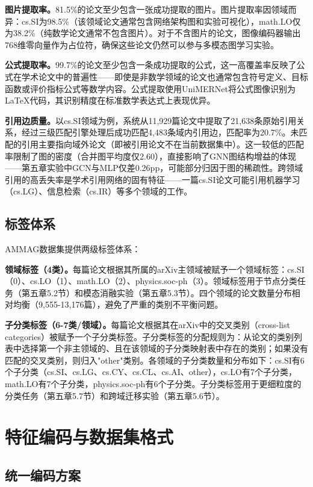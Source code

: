 \textbf{图片提取率。}81.5\%的论文至少包含一张成功提取的图片。图片提取率因领域而异：cs.SI为98.5\%（该领域论文通常包含网络架构图和实验可视化），math.LO仅为38.2\%（纯数学论文通常不包含图片）。对于不含图片的论文，图像编码器输出768维零向量作为占位符，确保这些论文仍然可以参与多模态图学习实验。

\textbf{公式提取率。}99.7\%的论文至少包含一条成功提取的公式，这一高覆盖率反映了公式在学术论文中的普遍性——即使是非数学领域的论文也通常包含符号定义、目标函数或评价指标公式等数学内容。公式提取使用UniMERNet\cite{wang2024unimernet}将公式图像识别为LaTeX代码，其识别精度在标准数学表达式上表现优异。

\textbf{引用边质量。}以cs.SI领域为例，系统从11,929篇论文中提取了21,638条原始引用关系，经过三级匹配引擎处理后成功匹配4,483条域内引用边，匹配率为20.7\%。未匹配的引用主要指向域外论文（即被引用论文不在当前数据集中）。这一较低的匹配率限制了图的密度（合并图平均度仅2.60），直接影响了GNN图结构增益的体现——第五章实验中GCN与MLP仅差0.26pp，可能部分归因于图的稀疏性。跨领域引用的高丢失率是学术引用网络的固有特征——一篇cs.SI论文可能引用机器学习（cs.LG）、信息检索（cs.IR）等多个领域的工作。

\subsection{标签体系}

AMMAG数据集提供两级标签体系：

\textbf{领域标签（4类）。}每篇论文根据其所属的arXiv主领域被赋予一个领域标签：cs.SI（0）、cs.LO（1）、math.LO（2）、physics.soc-ph（3）。领域标签用于节点分类任务（第五章5.2节）和模态消融实验（第五章5.3节）。四个领域的论文数量分布相对均衡（9,555-13,176篇），避免了严重的类别不平衡问题。

\textbf{子分类标签（6-7类/领域）。}每篇论文根据其在arXiv中的交叉类别（cross-list categories）被赋予一个子分类标签。子分类标签的分配规则为：从论文的类别列表中选择第一个非主领域的、且在该领域的子分类映射表中存在的类别；如果没有匹配的交叉类别，则归入"other"类别。各领域的子分类数量和分布如下：cs.SI有6个子分类（cs.SI、cs.LG、cs.CY、cs.CL、cs.AI、other），cs.LO有7个子分类，math.LO有7个子分类，physics.soc-ph有6个子分类。子分类标签用于更细粒度的分类任务（第五章5.7节）和跨域迁移实验（第五章5.6节）。

\section{特征编码与数据集格式}

\subsection{统一编码方案}

